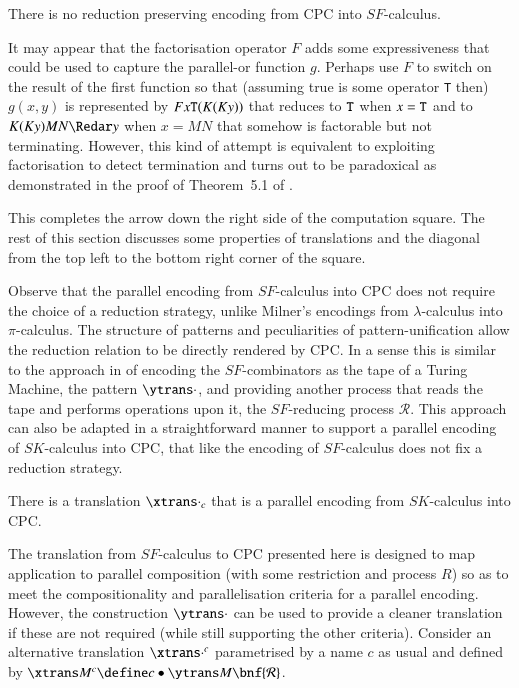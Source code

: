 \documentclass{llncs}
\begin{document}
\begin{theorem}
\label{thm:noCPC2SF}
There is no reduction preserving encoding from CPC into $SF$-calculus.
\end{theorem}


It may appear that the factorisation operator $F$ adds some expressiveness that could
be used to capture the parallel-or function $g$.
Perhaps use $F$ to switch on the result of the first function so that (assuming true
is some operator {\tt T} then) $g(x,y)$ is represented by $Fx{\tt T}(K(Ky))$ that reduces to
${\tt T}$ when $x={\tt T}$ and to $K(Ky)MN\Redar y$ when $x=MN$ that somehow is factorable but
not terminating.
However, this kind of attempt is equivalent to exploiting factorisation to detect termination 
and turns out to be paradoxical as demonstrated in the proof of Theorem~5.1 of \cite{JayGW11}.




This completes the arrow down the right side of the computation square. The rest of this section discusses some properties of translations and the diagonal from the top left to the bottom right corner of the square.

\medskip

Observe that the parallel encoding from $SF$-calculus into CPC does not require the choice of a reduction strategy, unlike Milner's encodings from $\lambda$-calculus into $\pi$-calculus.
The structure of patterns and peculiarities of pattern-unification allow the reduction relation to be directly rendered by CPC.
In a sense this is similar to the approach in \cite{givenwilson:hal-00987594} of encoding the $SF$-combinators as the tape
of a Turing Machine, the pattern $\ytrans\cdot$,
and providing another process that reads the tape and performs operations upon it, the $SF$-reducing process
${\mathcal R}$.
This approach can also be adapted in a straightforward manner to support a parallel encoding of
$SK$-calculus into CPC, that like the encoding of $SF$-calculus does not fix a reduction strategy.

\begin{theorem}
\label{thm:SK2CPC}
There is a translation $\xtrans\cdot _c$ that is a parallel encoding from $SK$-calculus into CPC.
\end{theorem}


The translation from $SF$-calculus to CPC presented here is designed to map application to 
parallel composition (with some restriction and process $R$) so as to meet the
compositionality
and parallelisation
criteria for a parallel encoding.
However, the construction $\ytrans\cdot$ can be used to provide a cleaner translation if 
these are not required
(while still supporting the other criteria).
Consider an alternative translation $\xtrans \cdot ^c$ parametrised by a name $c$ as usual and defined by
$\xtrans M ^c \define c\bullet\ytrans M \bnf {\mathcal R}$.
\end{document}

